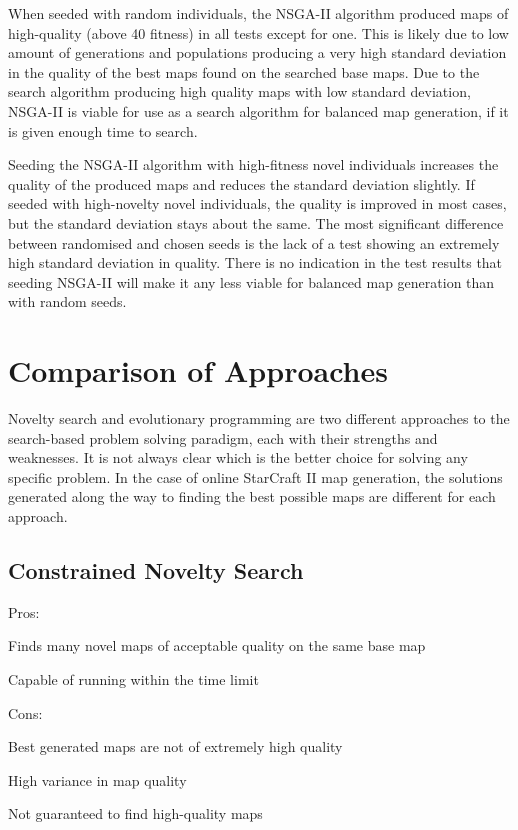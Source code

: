 When seeded with random individuals, the NSGA-II algorithm produced maps of high-quality (above 40 fitness) in all tests except for one. This is likely due to low amount of generations and populations producing a very high standard deviation in the quality of the best maps found on the searched base maps. Due to the search algorithm producing high quality maps with low standard deviation, NSGA-II is viable for use as a search algorithm for balanced map generation, if it is given enough time to search.

Seeding the NSGA-II algorithm with high-fitness novel individuals increases the quality of the produced maps and reduces the standard deviation slightly. If seeded with high-novelty novel individuals, the quality is improved in most cases, but the standard deviation stays about the same. The most significant difference between randomised and chosen seeds is the lack of a test showing an extremely high standard deviation in quality. There is no indication in the test results that seeding NSGA-II will make it any less viable for balanced map generation than with random seeds. 

\section{Comparison of Approaches}
\label{discussion_comparison}
Novelty search and evolutionary programming are two different approaches to the search-based problem solving paradigm, each with their strengths and weaknesses. It is not always clear which is the better choice for solving any specific problem. In the case of online StarCraft II map generation, the solutions generated along the way to finding the best possible maps are different for each approach.

\subsection{Constrained Novelty Search}
\label{discussion_comparison_constrainednoveltysearch}
Pros:
\begin{my_itemize}
\item Finds many novel maps of acceptable quality on the same base map
\item Capable of running within the time limit
\end{my_itemize}
Cons:
\begin{my_itemize}
\item Best generated maps are not of extremely high quality
\item High variance in map quality
\item Not guaranteed to find high-quality maps
\end{my_itemize}

